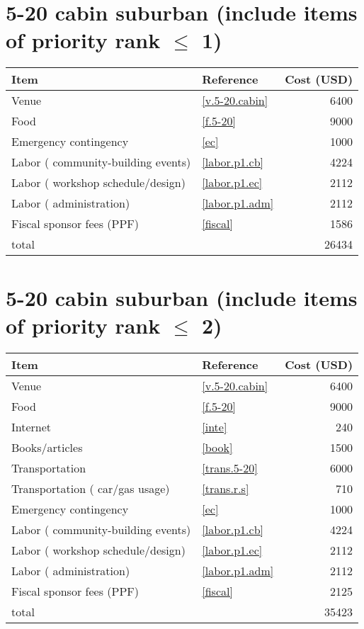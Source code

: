 \section*{5-20 cabin suburban (include items of priority rank $\leq$ 1)}
\begin{center}
\begin{tabular}{llr}
Item & Reference & Cost (USD) \\ \hline
Venue & \ref{v.5-20.cabin} & 6400 \\
Food & \ref{f.5-20} & 9000 \\
Emergency contingency & \ref{ec} & 1000 \\
Labor ( community-building events) & \ref{labor.p1.cb} & 4224 \\
Labor ( workshop schedule/design) & \ref{labor.p1.ec} & 2112 \\
Labor ( administration) & \ref{labor.p1.adm} & 2112 \\
Fiscal sponsor fees (PPF) & \ref{fiscal} & 1586 \\ \hline
total &  & 26434
\end{tabular}
\end{center}
\newpage
\section*{5-20 cabin suburban (include items of priority rank $\leq$ 2)}
\begin{center}
\begin{tabular}{llr}
Item & Reference & Cost (USD) \\ \hline
Venue & \ref{v.5-20.cabin} & 6400 \\
Food & \ref{f.5-20} & 9000 \\
Internet & \ref{inte} & 240 \\
Books/articles & \ref{book} & 1500 \\
Transportation & \ref{trans.5-20} & 6000 \\
Transportation ( car/gas usage) & \ref{trans.r.s} & 710 \\
Emergency contingency & \ref{ec} & 1000 \\
Labor ( community-building events) & \ref{labor.p1.cb} & 4224 \\
Labor ( workshop schedule/design) & \ref{labor.p1.ec} & 2112 \\
Labor ( administration) & \ref{labor.p1.adm} & 2112 \\
Fiscal sponsor fees (PPF) & \ref{fiscal} & 2125 \\ \hline
total &  & 35423
\end{tabular}
\end{center}
\newpage
